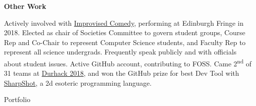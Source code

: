 \documentclass[hidelinks, 12pt, a4paper]{article}
\newcommand{\sectionheader}[1]{
	\vspace{6pt}
	{
		\noindent
		\hspace{3pt}
		\Large\textbf{#1}}}
\begin{document}
\begin{minipage}{0.6\textwidth}
		\sectionheader{Other Work}
		\vspace{4pt}
		
		Actively involved with \href{http://community.dur.ac.uk/dur.improv/}{Improvised Comedy}, performing at Edinburgh Fringe in 2018. Elected as chair of Societies Committee to govern student groups, Course Rep and Co-Chair to represent Computer Science students, and Faculty Rep to represent all science undergrads. Frequently speak publicly and with officials about student issues. Active GitHub account, contributing to FOSS. Came 2\textsuperscript{nd} of 31 teams at \href{https://durhack.com/}{Durhack 2018}, and won the GitHub prize for best Dev Tool with \href{https://github.com/motherlymuppet/sharpshot}{SharpShot}, a 2d esoteric programming language.
	\end{minipage}
	
	\newpage
	
	\vspace*{12pt}
	
	\begin{center}
		\Huge Portfolio
	\end{center}
	
\end{document}

